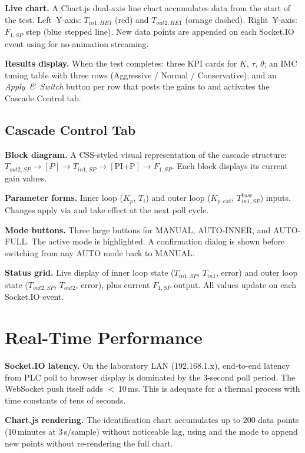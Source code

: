 \textbf{Live chart.}
A Chart.js dual-axis line chart accumulates data from the start of the test.
Left~Y-axis: $T_{in1,HE1}$ (red) and $T_{out2,HE1}$ (orange dashed).
Right~Y-axis: $F_{1,SP}$ step (blue stepped line). New data points are appended on each
 Socket.IO event using  for no-animation
streaming.

\textbf{Results display.}
When the test completes: three KPI cards for $K$, $\tau$, $\theta$; an IMC tuning table
with three rows (Aggressive / Normal / Conservative); and an \textit{Apply~\&~Switch} button
per row that posts the gains to  and activates the Cascade
Control tab.

\subsection{Cascade Control Tab}

\textbf{Block diagram.}
A CSS-styled visual representation of the cascade structure:
$T_{out2,SP} \rightarrow [P] \rightarrow T_{in1,SP} \rightarrow [\text{PI+P}]
\rightarrow F_{1,SP}$.
Each block displays its current gain values.

\textbf{Parameter forms.}
Inner loop ($K_p$, $T_i$) and outer loop ($K_{p,ext}$, $T_{in1,SP}^{\text{base}}$)
inputs. Changes apply via  and take effect at the next
poll cycle.

\textbf{Mode buttons.}
Three large buttons for MANUAL, AUTO-INNER, and AUTO-FULL. The active mode is highlighted.
A confirmation dialog is shown before switching from any AUTO mode back to MANUAL.

\textbf{Status grid.}
Live display of inner loop state ($T_{in1,SP}$, $T_{in1}$, error) and outer loop state
($T_{out2,SP}$, $T_{out2}$, error), plus current $F_{1,SP}$ output.
All values update on each  Socket.IO event.

\section{Real-Time Performance}

\textbf{Socket.IO latency.}
On the laboratory LAN (192.168.1.x), end-to-end latency from PLC poll to browser display
is dominated by the 3-second poll period. The WebSocket push itself adds $<$\,10\,ms.
This is adequate for a thermal process with time constants of tens of seconds.

\textbf{Chart.js rendering.}
The identification chart accumulates up to 200 data points (10\,minutes at 3\,s/sample)
without noticeable lag, using  and the
 mode to append new points without re-rendering the full chart.

